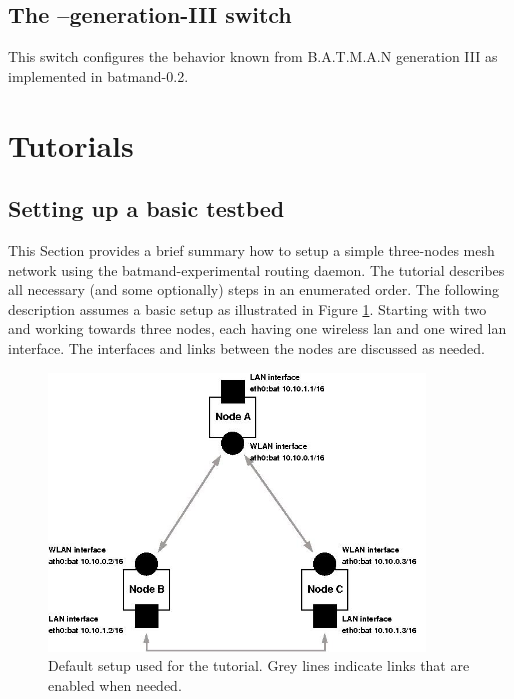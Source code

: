 \documentclass[11pt]{article}
\begin{document}
\subsection{The --generation-III switch}
\label{sec:generation-III}

This switch configures the behavior known from B.A.T.M.A.N generation III as implemented in batmand-0.2. 




\section{Tutorials}
\label{sec:howto}

\subsection{Setting up a basic testbed}
\label{sec:howto-basics}

This Section provides a brief summary how to setup a simple three-nodes mesh network using the batmand-experimental routing daemon. 
%
The tutorial describes all necessary (and some optionally) steps in an enumerated order. 
%
The following description assumes a basic setup as illustrated in Figure \ref{fig:howto-setup}.
Starting with two and working towards three nodes, each having one wireless lan and one wired lan interface. The interfaces and links between the nodes are discussed as needed.

\begin{figure}[htbp]
  \begin{center}
    \includegraphics[width=10cm]{tutorial-setup-x01.jpg}
    \caption{Default setup used for the tutorial. Grey lines indicate links that are enabled when needed.}
    \label{fig:howto-setup}
  \end{center}
\end{figure}
\end{document}
